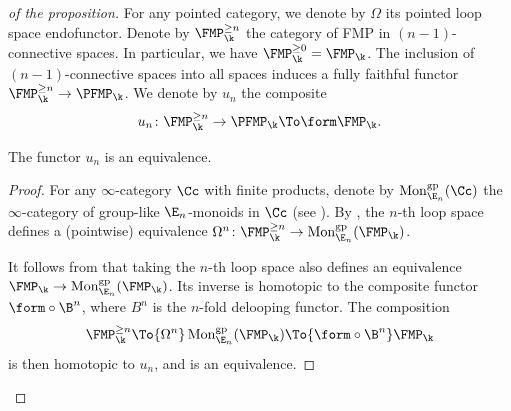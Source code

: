 \begin{proof}[of the proposition]
For any pointed category, we denote by $\Omega$ its pointed loop space endofunctor.
Denote by $\FMP_\k^{\geq n}$ the category of FMP in $(n-1)$-connective spaces. In particular, we have $\FMP_\k^{\geq 0} = \FMP_\k$.
The inclusion of $(n-1)$-connective spaces into all spaces induces a fully faithful functor $\FMP_\k^{\geq n} \to \PFMP_\k$. We denote by $u_n$ the composite
\[
u_n \colon \FMP_\k^{\geq n} \to \PFMP_\k \To\form \FMP_\k.
\]
\begin{lem}
The functor $u_n$ is an equivalence.
\end{lem}
\begin{proof}
For any $\infty$-category $\Cc$ with finite products, denote by $\operatorname{Mon}_{\E_n}^\mathrm{gp}(\Cc)$ the $\infty$-category of group-like $\E_n$-monoids in $\Cc$ (see \cite[Def.\,5.2.6.6]{lurie:halg}). By \cite[Th.\,5.2.6.10]{lurie:halg}, the $n$-th loop space defines a (pointwise) equivalence $\Omega^n \colon \FMP_\k^{\geq n} \to \operatorname{Mon}_{\E_n}^\mathrm{gp}(\FMP_\k)$.

It follows from \cite[Prop.\,2.15]{blanckatzarkovpandit} that taking the $n$-th loop space also defines an equivalence $\FMP_\k \to \operatorname{Mon}_{\E_n}^\mathrm{gp}(\FMP_\k)$. Its inverse is homotopic to the composite functor $\form \circ \B^n$, where $B^n$ is the $n$-fold delooping functor.
The composition
\[
\FMP_\k^{\geq n} \To{\Omega^n} \operatorname{Mon}_{\E_n}^\mathrm{gp}(\FMP_\k) \To{\form \circ \B^n} \FMP_\k
\]
is then homotopic to $u_n$, and is an equivalence.
\end{proof}


\end{proof}
